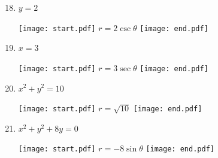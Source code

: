 \documentclass[12pt]{article}
\begin{document}
\begin{enumerate}
\setcounter{enumi}{17}
\item $y=2$ 

\texttt{[image: start.pdf]}
{{$r=2\csc{\theta}$}}
\texttt{[image: end.pdf]}


\item $x=3$ 

\texttt{[image: start.pdf]}
{{$r=3\sec{\theta}$}}
\texttt{[image: end.pdf]}


\item $x^2+y^2=10$ 

\texttt{[image: start.pdf]}
{{$r=\sqrt{10}$}}
\texttt{[image: end.pdf]}


\item $x^2+y^2+8y=0$

\texttt{[image: start.pdf]}
{{$r=-8\sin{\theta}$}}
\texttt{[image: end.pdf]}


\end{enumerate}

\end{document}
